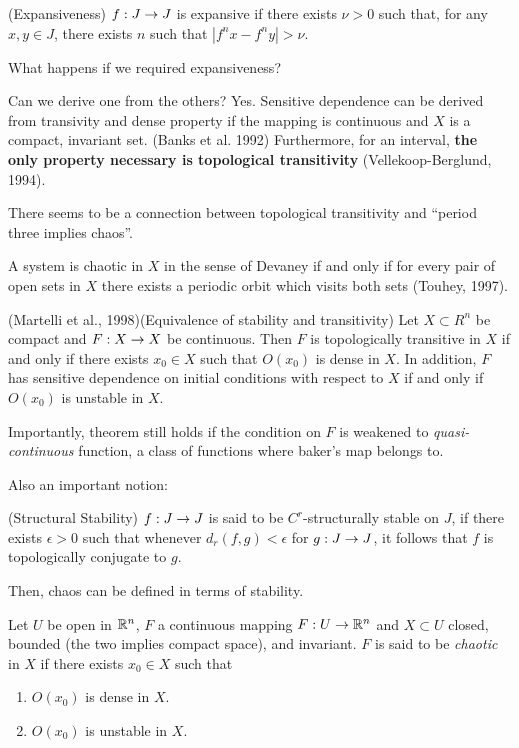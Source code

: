 \documentclass[11pt]{article}
\begin{document}
\begin{definition}
  (Expansiveness) $f: J\rightarrow J$ is expansive if there exists $\nu > 0$
  such that, for any $x,y\in J$, there exists $n$ such that
  $|f^nx-f^ny| > \nu$.
\end{definition}

What happens if we required expansiveness?

Can we derive one from the others? Yes. Sensitive dependence
can be derived from transivity and dense property if the mapping
is continuous and $X$ is a compact, invariant set. (Banks et al. 1992)
Furthermore, for an interval, {\bf the only property necessary is
topological transitivity} (Vellekoop-Berglund, 1994).

There seems to be a connection between topological transitivity and
``period three implies chaos''.

A system is chaotic in $X$ in the sense of Devaney if and only if
for every pair of open sets in $X$ there exists a periodic orbit 
which visits both sets (Touhey, 1997).

\begin{proposition}
  (Martelli et al., 1998)(Equivalence of stability and transitivity)
  Let $X\subset R^n$ be compact and $F: X\rightarrow X$ be continuous.
  Then $F$ is topologically transitive in $X$ if and only if
  there exists $x_0\in X$ such that $O(x_0)$ is dense in $X$.
  In addition, $F$ has sensitive dependence on initial conditions 
  with respect to $X$ if and only if $O(x_0)$ is unstable in $X$.
\end{proposition}

Importantly, theorem still holds if the condition on $F$ is 
weakened to {\it quasi-continuous} function, a class of functions
where baker's map belongs to.

Also an important notion:
\begin{definition}
  (Structural Stability) $f: J \rightarrow J$ is said to be $C^r$-structurally
  stable on $J$, if there exists $\epsilon > 0$ such that whenever
  $d_r(f,g) < \epsilon$ for $g: J\rightarrow J$, it follows that $f$
  is topologically conjugate to $g$.
\end{definition}

Then, chaos can be defined in terms of stability.
\begin{definition}
  Let $U$ be open in $\mathbb{R}^n$, $F$ a continuous mapping $F: U\rightarrow \mathbb{R}^n$ and $X\subset U$
  closed, bounded (the two implies compact space), and invariant.
  $F$ is said to be {\it chaotic} in $X$ if there exists $x_0\in X$
  such that
  \begin{enumerate}
    \item $O(x_0)$ is dense in $X$.
    \item $O(x_0)$ is unstable in $X$.
  \end{enumerate}
\end{definition}
\end{document}
